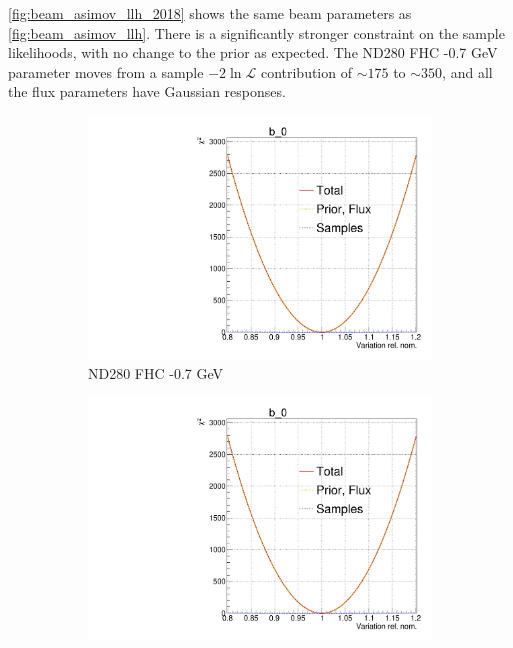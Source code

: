 \autoref{fig:beam_asimov_llh_2018} shows the same beam parameters as \autoref{fig:beam_asimov_llh}. There is a significantly stronger constraint on the sample likelihoods, with no change to the prior as expected. The ND280 FHC -0.7 GeV parameter moves from a sample $-2\ln\mathcal{L}$ contribution of $\sim175$ to $\sim350$, and all the flux parameters have Gaussian responses. 
\begin{figure}[h]
	\centering
	\begin{subfigure}[t]{0.32\textwidth}
		\includegraphics[width=\textwidth, trim={0mm 0mm 0mm 11mm}, clip,page=5]{figures/mach3/2018/llh/tryBinningNumber6_after_fit_asimov_asimov_ND280logL_scan}
		\caption{ND280 FHC -0.7 GeV}
	\end{subfigure}
	\begin{subfigure}[t]{0.32\textwidth}
		\includegraphics[width=\textwidth, trim={0mm 0mm 0mm 11mm}, clip,page=13]{figures/mach3/2018/llh/tryBinningNumber6_after_fit_asimov_asimov_ND280logL_scan}

\end{subfigure}
\end{figure}
